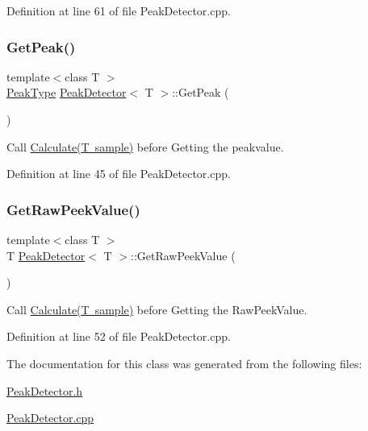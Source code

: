 Definition at line 61 of file Peak\+Detector.\+cpp.

\mbox{\label{class_peak_detector_a72f7916aa1d26388c9d70eee1cd5e3bc}} 
\subsubsection{\texorpdfstring{Get\+Peak()}{GetPeak()}}
{\footnotesize\ttfamily template$<$class T $>$ \\
\mbox{\hyperlink{_peak_detector_8h_a4791e14c9f62a95fdf58cd8b41ca6a08}{Peak\+Type}} \mbox{\hyperlink{class_peak_detector}{Peak\+Detector}}$<$ T $>$\+::Get\+Peak (\begin{DoxyParamCaption}{ }\end{DoxyParamCaption})}



Call \mbox{\hyperlink{class_peak_detector_a888b9d29612caf03e7417ab3593f6392}{Calculate(\+T sample)}} before Getting the peakvalue. 



Definition at line 45 of file Peak\+Detector.\+cpp.

\mbox{\label{class_peak_detector_aebfc5583c4c696119bbe834b1474d896}} 
\subsubsection{\texorpdfstring{Get\+Raw\+Peek\+Value()}{GetRawPeekValue()}}
{\footnotesize\ttfamily template$<$class T $>$ \\
T \mbox{\hyperlink{class_peak_detector}{Peak\+Detector}}$<$ T $>$\+::Get\+Raw\+Peek\+Value (\begin{DoxyParamCaption}{ }\end{DoxyParamCaption})}



Call \mbox{\hyperlink{class_peak_detector_a888b9d29612caf03e7417ab3593f6392}{Calculate(\+T sample)}} before Getting the Raw\+Peek\+Value. 



Definition at line 52 of file Peak\+Detector.\+cpp.



The documentation for this class was generated from the following files\+:\begin{DoxyCompactItemize}
\item 
\mbox{\hyperlink{_peak_detector_8h}{Peak\+Detector.\+h}}\item 
\mbox{\hyperlink{_peak_detector_8cpp}{Peak\+Detector.\+cpp}}\end{DoxyCompactItemize}
